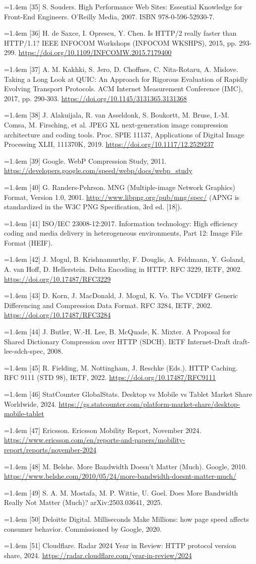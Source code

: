 \documentclass[3p,twocolumn]{elsarticle}
\newcommand{\reference}[1]{\par\noindent\hangindent=1.4em\hangafter=1 #1\par\vspace{2pt}}
\begin{document}
{\reference{[35] S. Souders. High Performance Web Sites: Essential Knowledge for Front-End Engineers. O'Reilly Media, 2007. ISBN 978-0-596-52930-7.}
\reference{[36] H. de Saxce, I. Oprescu, Y. Chen. Is HTTP/2 really faster than HTTP/1.1? IEEE INFOCOM Workshops (INFOCOM WKSHPS), 2015, pp. 293-299. \url{https://doi.org/10.1109/INFCOMW.2015.7179400}}
\reference{[37] A. M. Kakhki, S. Jero, D. Choffnes, C. Nita-Rotaru, A. Mislove. Taking a Long Look at QUIC: An Approach for Rigorous Evaluation of Rapidly Evolving Transport Protocols. ACM Internet Measurement Conference (IMC), 2017, pp. 290-303. \url{https://doi.org/10.1145/3131365.3131368}}
\reference{[38] J. Alakuijala, R. van Asseldonk, S. Boukortt, M. Bruse, I.-M. Comsa, M. Firsching, et al. JPEG XL next-generation image compression architecture and coding tools. Proc. SPIE 11137, Applications of Digital Image Processing XLII, 111370K, 2019. \url{https://doi.org/10.1117/12.2529237}}
\reference{[39] Google. WebP Compression Study, 2011. \url{https://developers.google.com/speed/webp/docs/webp_study}}
\reference{[40] G. Randers-Pehrson. MNG (Multiple-image Network Graphics) Format, Version 1.0, 2001. \url{http://www.libpng.org/pub/mng/spec/} (APNG is standardized in the W3C PNG Specification, 3rd ed. [18]).}
\reference{[41] ISO/IEC 23008-12:2017. Information technology: High efficiency coding and media delivery in heterogeneous environments, Part 12: Image File Format (HEIF).}
\reference{[42] J. Mogul, B. Krishnamurthy, F. Douglis, A. Feldmann, Y. Goland, A. van Hoff, D. Hellerstein. Delta Encoding in HTTP. RFC 3229, IETF, 2002. \url{https://doi.org/10.17487/RFC3229}}
\reference{[43] D. Korn, J. MacDonald, J. Mogul, K. Vo. The VCDIFF Generic Differencing and Compression Data Format. RFC 3284, IETF, 2002. \url{https://doi.org/10.17487/RFC3284}}
\reference{[44] J. Butler, W.-H. Lee, B. McQuade, K. Mixter. A Proposal for Shared Dictionary Compression over HTTP (SDCH). IETF Internet-Draft draft-lee-sdch-spec, 2008.}
\reference{[45] R. Fielding, M. Nottingham, J. Reschke (Eds.). HTTP Caching. RFC 9111 (STD 98), IETF, 2022. \url{https://doi.org/10.17487/RFC9111}}
\reference{[46] StatCounter GlobalStats. Desktop vs Mobile vs Tablet Market Share Worldwide, 2024. \url{https://gs.statcounter.com/platform-market-share/desktop-mobile-tablet}}
\reference{[47] Ericsson. Ericsson Mobility Report, November 2024. \url{https://www.ericsson.com/en/reports-and-papers/mobility-report/reports/november-2024}}
\reference{[48] M. Belshe. More Bandwidth Doesn't Matter (Much). Google, 2010. \url{https://www.belshe.com/2010/05/24/more-bandwidth-doesnt-matter-much/}}
\reference{[49] S. A. M. Mostafa, M. P. Wittie, U. Goel. Does More Bandwidth Really Not Matter (Much)? arXiv:2503.03641, 2025.}
\reference{[50] Deloitte Digital. Milliseconds Make Millions: how page speed affects consumer behavior. Commissioned by Google, 2020.}
\reference{[51] Cloudflare. Radar 2024 Year in Review: HTTP protocol version share, 2024. \url{https://radar.cloudflare.com/year-in-review/2024}}
}
\end{document}
